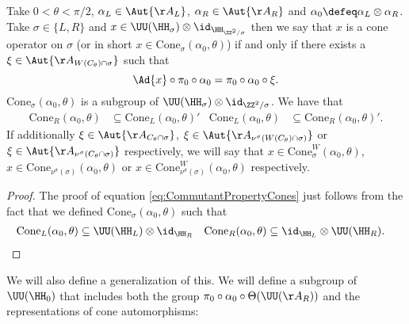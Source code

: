 \begin{definition}\label{def:ConeOperators}
	Take $0<\theta<\pi/2$, $\alpha_L\in\Aut{\AA_{L}}$, $\alpha_R\in\Aut{\AA_{R}}$ and $\alpha_0\defeq \alpha_L\otimes\alpha_R$. Take $\sigma\in\{L,R\}$ and $x\in\UU(\HH_{\sigma})\otimes\id_{\HH_{\ZZ^2/\sigma}}$ then we say that $x$ is a cone operator on $\sigma$ (or in short $x\in\textrm{Cone}_{\sigma}(\alpha_0,\theta)$) if and only if there exists a $\xi\in\Aut{\AA_{W(C_\theta)\cap\sigma}}$ such that
	\begin{equation}
		\Ad{x}\circ\pi_0\circ\alpha_0=\pi_0\circ\alpha_0\circ\xi.
	\end{equation}
	$\textrm{Cone}_\sigma(\alpha_0,\theta)$ is a subgroup of $\UU(\HH_\sigma)\otimes\id_{\ZZ^2/\sigma}$. We have that
	\begin{align}\label{eq:CommutantPropertyCones}
		\textrm{Cone}_R(\alpha_0,\theta)&\subseteq\textrm{Cone}_L(\alpha_0,\theta)'&\textrm{Cone}_L(\alpha_0,\theta)&\subseteq\textrm{Cone}_R(\alpha_0,\theta)'.
	\end{align}
	If additionally $\xi\in\Aut{\AA_{C_\theta\cap\sigma}}$, $\xi\in\Aut{\AA_{\nu^\sigma(W(C_\theta)\cap\sigma)}}$ or $\xi\in\Aut{\AA_{\nu^\sigma(C_\theta\cap\sigma)}}$ respectively, we will say that $x\in\textrm{Cone}_\sigma^W(\alpha_0,\theta)$, $x\in\textrm{Cone}_{\nu^\sigma(\sigma)}(\alpha_0,\theta)$ or $x\in\textrm{Cone}_{\nu^\sigma(\sigma)}^W(\alpha_0,\theta)$ respectively.
\end{definition}
\begin{proof}
	The proof of equation \eqref{eq:CommutantPropertyCones} just follows from the fact that we defined $\textrm{Cone}_\sigma(\alpha_0,\theta)$ such that
	\begin{align}
		\textrm{Cone}_L(\alpha_0,\theta)&\subseteq \UU(\HH_L)\otimes\id_{\HH_R}&\textrm{Cone}_R(\alpha_0,\theta)&\subseteq \id_{\HH_L} \otimes \UU(\HH_R).
	\end{align}
\end{proof}
We will also define a generalization of this. We will define a subgroup of $\UU(\HH_0)$ that includes both the group $\pi_0\circ\alpha_0\circ\Theta(\UU(\AA_R))$ and the representations of cone automorphisms:
